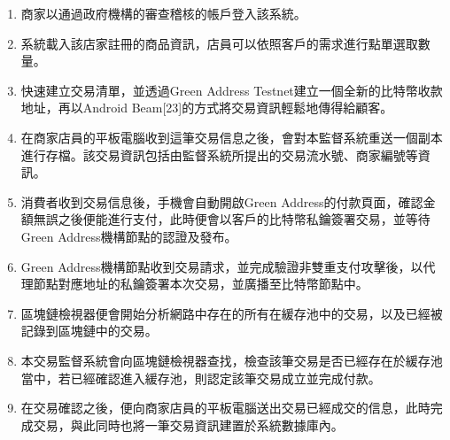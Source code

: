 	\begin{enumerate}
		\item 商家以通過政府機構的審查稽核的帳戶登入該系統。
		\item 系統載入該店家註冊的商品資訊，店員可以依照客戶的需求進行點單選取數量。
		\item 快速建立交易清單，並透過Green Address Testnet建立一個全新的比特幣收款地址，再以Android Beam[23]的方式將交易資訊輕鬆地傳得給顧客。
		\item 在商家店員的平板電腦收到這筆交易信息之後，會對本監督系統重送一個副本進行存檔。該交易資訊包括由監督系統所提出的交易流水號、商家編號等資訊。
		\item 消費者收到交易信息後，手機會自動開啟Green Address的付款頁面，確認金額無誤之後便能進行支付，此時便會以客戶的比特幣私鑰簽署交易，並等待Green Address機構節點的認證及發布。
		\item Green Address機構節點收到交易請求，並完成驗證非雙重支付攻擊後，以代理節點對應地址的私鑰簽署本次交易，並廣播至比特幣節點中。
		\item 區塊鏈檢視器便會開始分析網路中存在的所有在緩存池中的交易，以及已經被記錄到區塊鏈中的交易。
		\item 本交易監督系統會向區塊鏈檢視器查找，檢查該筆交易是否已經存在於緩存池當中，若已經確認進入緩存池，則認定該筆交易成立並完成付款。
		\item 在交易確認之後，便向商家店員的平板電腦送出交易已經成交的信息，此時完成交易，與此同時也將一筆交易資訊建置於系統數據庫內。
	\end{enumerate}
	
	
